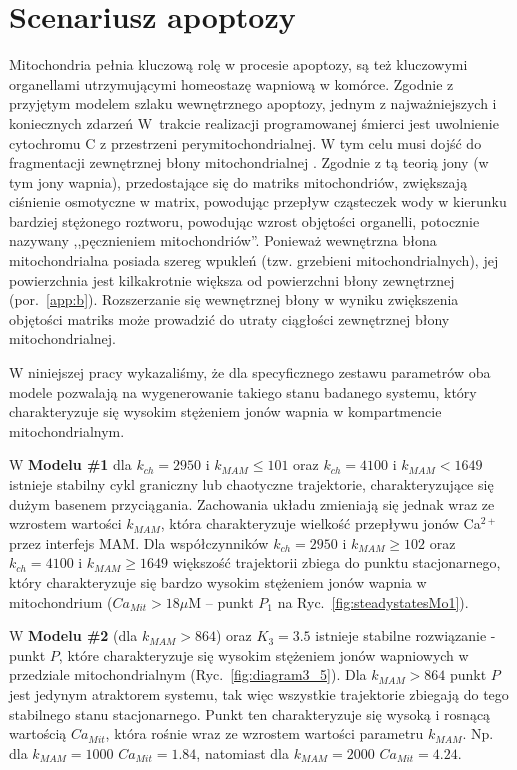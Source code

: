 \FloatBarrier
\section{Scenariusz apoptozy}\label{s:scenariusz}

Mitochondria pełnia kluczową rolę w procesie apoptozy, są też kluczowymi organellami utrzymującymi homeostazę wapniową w komórce. Zgodnie z przyjętym modelem szlaku wewnętrznego apoptozy, jednym z najważniejszych i koniecznych zdarzeń W~trakcie realizacji programowanej śmierci jest uwolnienie cytochromu C z przestrzeni perymitochondrialnej. W tym celu musi dojść do fragmentacji zewnętrznej błony mitochondrialnej \cite{VanderHeiden1997}. Zgodnie z tą teorią jony (w tym jony wapnia), przedostające się do matriks mitochondriów, zwiększają ciśnienie osmotyczne w matrix, powodując przepływ cząsteczek wody w kierunku bardziej stężonego roztworu, powodując wzrost objętości organelli, potocznie nazywany ,,pęcznieniem mitochondriów''. Ponieważ wewnętrzna błona mitochondrialna posiada szereg wpukleń (tzw. grzebieni mitochondrialnych), jej powierzchnia jest kilkakrotnie większa od powierzchni błony zewnętrznej (por.~\ref{app:b}). Rozszerzanie się wewnętrznej błony w wyniku zwiększenia objętości matriks może prowadzić do utraty ciągłości zewnętrznej błony mitochondrialnej.

W niniejszej pracy wykazaliśmy, że dla specyficznego zestawu parametrów oba modele pozwalają na wygenerowanie takiego stanu badanego systemu, który charakteryzuje się wysokim stężeniem jonów wapnia w kompartmencie mitochondrialnym. 

W \textbf{Modelu \#1} dla $k_{ch}=2950$ i $k_{MAM} \leq 101$ oraz  $k_{ch} = 4100$ i $k_{MAM} < 1649$ istnieje stabilny cykl graniczny lub chaotyczne trajektorie, charakteryzujące się dużym basenem przyciągania. Zachowania układu zmieniają się jednak wraz ze wzrostem wartości $k_{MAM}$, która charakteryzuje wielkość przepływu jonów Ca$^{2+}$ przez interfejs MAM. Dla współczynników  $k_{ch}=2950$ i $k_{MAM} \geq 102$ oraz $k_{ch} = 4100$ i $k_{MAM} \geq 1649$ większość trajektorii zbiega do punktu stacjonarnego, który charakteryzuje się bardzo wysokim stężeniem jonów wapnia w mitochondrium ($Ca_{Mit}>18 \mu$M -- punkt $P_1$ na Ryc.~\ref{fig:steadystatesMo1}).

W \textbf{Modelu \#2}  (dla $k_{MAM} > 864$) oraz  $K_3 = 3.5$ istnieje stabilne rozwiązanie - punkt $P$, które charakteryzuje się wysokim stężeniem jonów wapniowych w przedziale mitochondrialnym (Ryc.~\ref{fig:diagram3_5}). Dla $k_{MAM} > 864$ punkt $P$ jest jedynym atraktorem systemu, tak więc wszystkie trajektorie zbiegają do tego stabilnego stanu stacjonarnego. Punkt ten charakteryzuje się wysoką i rosnącą wartością $Ca_{Mit}$, która rośnie wraz ze wzrostem wartości parametru $k_{MAM}$. Np. dla $k_{MAM} = 1000$ $Ca_{Mit} = 1.84$, natomiast dla  $k_{MAM} = 2000$ $Ca_{Mit} = 4.24$. 

